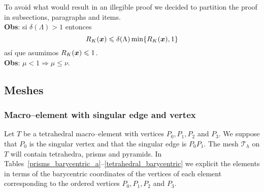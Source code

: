 To avoid what would result in an illegible proof we decided to partition
the proof in subsections, paragraphs and items.\\

\textbf{Obs}: si $\delta(\Lambda)>1$ entonces
\[
  R_K(\boldsymbol{x}) \leqslant \delta(\Lambda)\min\{ R_K(\boldsymbol{x}), 1\}
\]
as\'i que asumimos $R_K(\boldsymbol{x})\leqslant 1$.\\[7pt]
\textbf{Obs}: $\mu < 1 \Rightarrow \mu \leqslant \nu$. \\[7pt]

\subsection{Meshes}\label{meshes}
\subsubsection{Macro--element with singular edge and vertex}\label{caso4}
Let $T$ be a tetrahedral macro--element with vertices $P_0, P_1, P_2$ and $P_3$. We suppose that $P_0$ is the singular vertex and that the
singular edge is $P_0P_1$. The mesh $\mathcal T_h$ on $T$ will contain tetrahedra, prisms and pyramids. 
In Tables~\ref{prisms_barycentric_a}--\ref{tetrahedral_barycentric}
we explicit the elements in terms
of the barycentric coordinates of the vertices of each element corresponding to the ordered vertices $P_0, P_1, P_2$ and $P_3$.
\bigskip

\prismsBaryCoordA

\prismsBaryCoordB

\pyramidsBaryCoord

\tetrahedraBaryCoord

